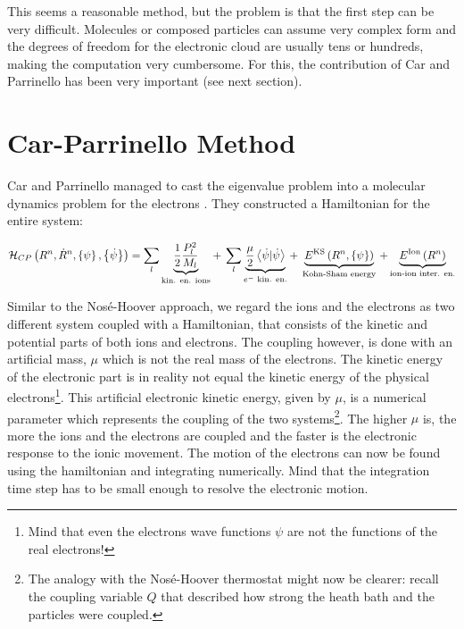 This seems a reasonable method, but the problem is that the first step can be very difficult. Molecules or composed particles can assume very complex form and the degrees of freedom for the electronic cloud are usually tens or hundreds, making the computation very cumbersome. For this, the contribution of Car and Parrinello has been very important (see next section).




\section{Car-Parrinello Method}


Car and Parrinello managed to cast the eigenvalue problem into a molecular dynamics problem for the electrons \citep{carpar1}. They constructed a Hamiltonian for the entire system:

\begin{equation}
\mathcal{H}_{CP} \left(R^n, \dot{R}^n, \left\{\psi\right\}, \left\{\dot{\psi}\right\} \right) 
=
\sum_l{   \underbrace{ \frac{1}{2}\frac{P_l^2}{M_l}}_{\text{kin. en. ions}}   }
+ \,
\sum_l{  \underbrace{  \frac{\mu}{2}\left<\dot{\psi}|\dot{\psi}\right> }_{e^-\text{ kin. en.}}   }
+\,
\underbrace{E^{\text{KS}}\left(R^n,\left\{\psi\right\}\right)}_{\text{Kohn-Sham energy}}
\,+
\underbrace{E^{\text{Ion}}\left(R^n\right)}_{\text{ion-ion inter. en.}}
\end{equation}


Similar to the Nos\'e-Hoover approach, we regard the ions and the electrons as two different system coupled with a Hamiltonian, that consists of the kinetic and potential parts of both ions and electrons. The coupling however, is done with an artificial mass, $\mu$ which is not the real mass of the electrons. The kinetic energy of the electronic part is in reality not equal the kinetic energy of the physical electrons\footnote{Mind that even the electrons wave functions $\psi$ are not the functions of the real electrons!}. This artificial electronic kinetic energy, given by $\mu$, is a numerical parameter which represents the coupling of the two systems\footnote{The analogy with the Nos\'e-Hoover thermostat might now be clearer: recall the coupling variable $Q$ that described how strong the heath bath and the particles were coupled.}. The higher $\mu$ is, the more the ions and the electrons are coupled and the faster is the electronic response to the ionic movement. The motion of the electrons can now be found using the hamiltonian and integrating numerically. Mind that the integration time step has to be small enough to resolve the electronic motion. 


